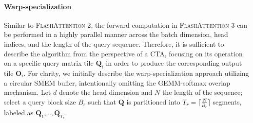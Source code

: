 \paragraph{Warp-specialization}
Similar to \textsc{FlashAttention-2}, the forward computation in \textsc{FlashAttention-3} can be performed in a highly parallel manner across the batch dimension, head indices, and the length of the query sequence. Therefore, it is sufficient to describe the algorithm from the perspective of a CTA, focusing on its operation on a specific query matrix tile $\mathbf{Q}_i$ in order to produce the corresponding output tile $\mathbf{O}_i$. For clarity, we initially describe the warp-specialization approach utilizing a circular SMEM buffer, intentionally omitting the GEMM-softmax overlap mechanism. Let $d$ denote the head dimension and $N$ the length of the sequence; select a query block size $B_r$ such that $\mathbf{Q}$ is partitioned into $T_r = \lceil \frac{N}{B_r} \rceil$ segments, labeled as $\mathbf{Q}_1, .., \mathbf{Q}_{T_r}$.


